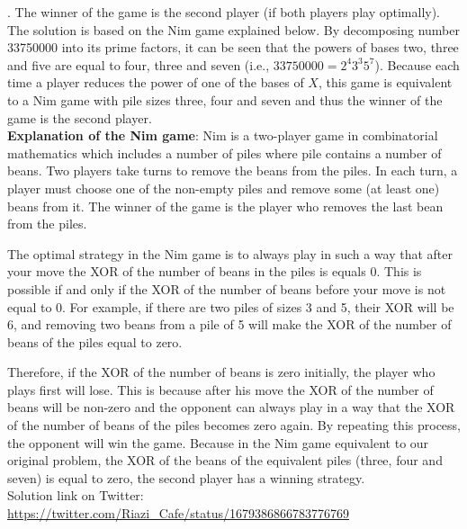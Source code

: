 \begin{solution}.
	The winner of the game is the second player (if both players play optimally).\\[0.2cm]
	
	The solution is based on the Nim game explained below. By decomposing  number 33750000 into its prime factors, it can be seen that the powers of bases two, three and five are equal to four, three and seven (i.e., $33750000 = 2^4 3^3 5^7$). Because each time a player reduces the power of one of the bases of $X$, this game is equivalent to a Nim game with pile sizes  three, four and seven and thus the winner of the game is the second player.\\[0.2cm]
	
	\textbf{Explanation of the Nim game}: Nim is a two-player game in combinatorial mathematics which includes a number of piles where pile contains a number of beans. Two players take turns to remove the beans from the piles. In each turn, a player must choose one of the non-empty piles and remove some (at least one) beans from it. The winner of the game is the player who removes the last bean from the piles.
	
	The optimal strategy in the Nim game is to always play in such a way that after your move the XOR of the number of beans in the piles is equals 0. This is possible if  and only if the XOR of the number of beans before your move is not equal to 0. For example, if there are two piles of sizes 3 and 5, their XOR will be 6, and removing two beans from a pile of 5 will make the XOR of the number of beans of the piles equal to zero.
	
	Therefore, if the XOR of the number of beans is zero initially, the player who plays first will lose. This is because after his move the XOR of the number of beans will be non-zero and the opponent can always play in a way that the XOR of the number of beans of the piles becomes zero again. By repeating this process, the opponent will win the game. Because in the Nim game equivalent to our original problem, the XOR of the beans of the equivalent piles (three, four and seven) is equal to zero,  the second player has a winning strategy.\\[0.2cm]
	
	
	Solution link on Twitter:  \url{https://twitter.com/Riazi_Cafe/status/1679386866783776769}\end{solution}